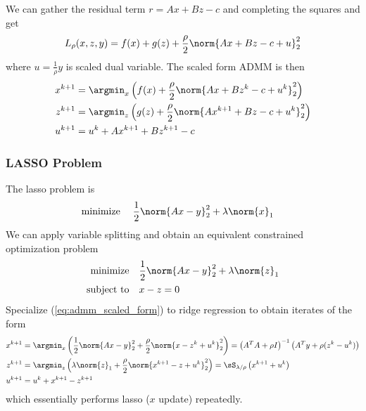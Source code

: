 \documentclass[../writeup.tex]{subfiles}
\begin{document}
We can gather the residual term $r=Ax+Bz-c$ and completing the squares and get
\begin{align}
    L_{\rho}(x,z,y)
        = f(x) + g(z) + \frac{\rho}{2} \norm{Ax + Bz - c + u}_2^2
    \label{eq:admm_scaled_augmented_lagrangian}
\end{align}
where $u=\frac{1}{\rho}y$ is scaled dual variable. The scaled form ADMM is then
\begin{align}
    x^{k+1}
        &= \argmin_x \left(
            f(x) + \frac{\rho}{2} \norm{Ax+Bz^k-c+u^k}_2^2 
        \right)
        \nonumber \\
    z^{k+1}
        &= \argmin_z \left(
            g(z) + \frac{\rho}{2} \norm{Ax^{k+1}+Bz-c+u^k}_2^2
        \right)
        \nonumber \\
    u^{k+1}
        &= u^k + Ax^{k+1} + Bz^{k+1} - c
    \label{eq:admm_scaled_form}
\end{align}

\subsubsection{LASSO Problem}

The lasso problem is 
\begin{align}
    \minimize\;
        & \frac{1}{2} \norm{Ax-y}_2^2 + \lambda \norm{x}_1
    \label{eq:lasso_unconstrained_problem}
\end{align}
We can apply variable splitting and obtain an equivalent constrained optimization problem
\begin{align}
    \minimize
        & \frac{1}{2} \norm{Ax-y}_2^2 + \lambda \norm{z}_1 \\
    \subjectto
        & x - z = 0
    \label{eq:lasso_unconstrained_problem_splitting}
\end{align}
Specialize (\ref{eq:admm_scaled_form}) to ridge regression to obtain iterates of the form
\begin{align} 
    x^{k+1}
        &= \argmin_x \left(
            \frac{1}{2}\norm{Ax-y}_2^2 + \frac{\rho}{2} \norm{x - z^k + u^k}_2^2
        \right)
        = \left( A^TA + \rho I \right)^{-1} \left( A^Ty + \rho(z^{k} - u^k) \right) \\
    z^{k+1}
        &= \argmin_z \left(
            \lambda \norm{z}_1 + \frac{\rho}{2} \norm{x^{k+1} - z + u^k }_2^2
        \right)
        = \sS_{\lambda/\rho} \left( x^{k+1} + u^k \right) \\
    u^{k+1}
        &= u^k + x^{k+1} - z^{k+1}
\end{align}
which essentially performs lasso ($x$ update) repeatedly.
\end{document}
